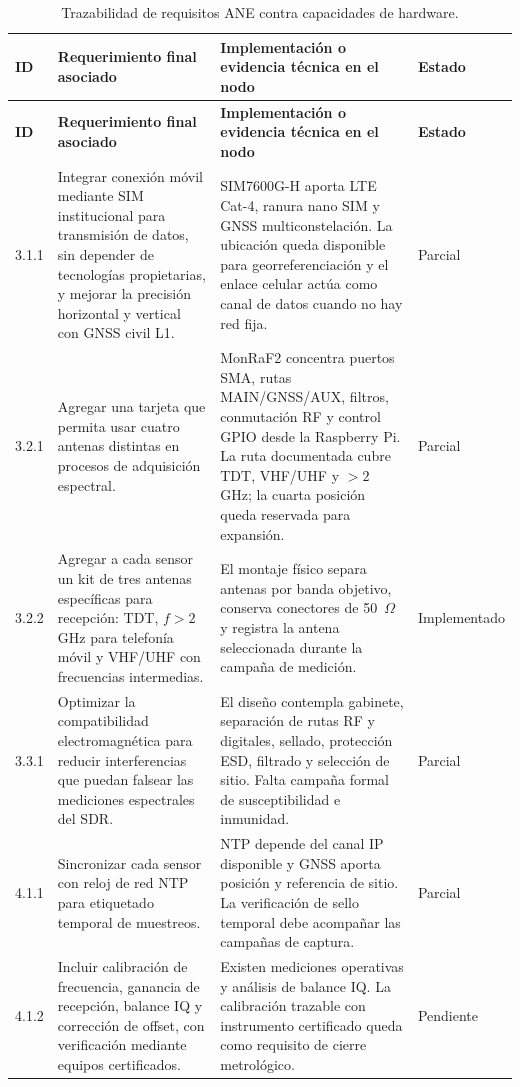 \scriptsize
\setlength{\tabcolsep}{3pt}
\begin{longtable}{@{}p{1.2cm} p{4.3cm} p{4.8cm} p{1.9cm}@{}}
\caption{Trazabilidad de requisitos ANE contra capacidades de hardware.}
\label{tab:hw_trazabilidad_requisitos}\\
\toprule
\textbf{ID} & \textbf{Requerimiento final asociado} & \textbf{Implementación o evidencia técnica en el nodo} & \textbf{Estado} \\
\midrule
\endfirsthead
\toprule
\textbf{ID} & \textbf{Requerimiento final asociado} & \textbf{Implementación o evidencia técnica en el nodo} & \textbf{Estado} \\
\midrule
\endhead
3.1.1 & Integrar conexión móvil mediante SIM institucional para transmisión de datos, sin depender de tecnologías propietarias, y mejorar la precisión horizontal y vertical con GNSS civil L1. & SIM7600G-H aporta LTE Cat-4, ranura nano SIM y GNSS multiconstelación. La ubicación queda disponible para georreferenciación y el enlace celular actúa como canal de datos cuando no hay red fija. & Parcial \\
3.2.1 & Agregar una tarjeta que permita usar cuatro antenas distintas en procesos de adquisición espectral. & MonRaF2 concentra puertos SMA, rutas MAIN/GNSS/AUX, filtros, conmutación RF y control GPIO desde la Raspberry Pi. La ruta documentada cubre TDT, VHF/UHF y $>2$ GHz; la cuarta posición queda reservada para expansión. & Parcial \\
3.2.2 & Agregar a cada sensor un kit de tres antenas específicas para recepción: TDT, $f>2$ GHz para telefonía móvil y VHF/UHF con frecuencias intermedias. & El montaje físico separa antenas por banda objetivo, conserva conectores de 50~$\Omega$ y registra la antena seleccionada durante la campaña de medición. & Implementado \\
3.3.1 & Optimizar la compatibilidad electromagnética para reducir interferencias que puedan falsear las mediciones espectrales del SDR. & El diseño contempla gabinete, separación de rutas RF y digitales, sellado, protección ESD, filtrado y selección de sitio. Falta campaña formal de susceptibilidad e inmunidad. & Parcial \\
4.1.1 & Sincronizar cada sensor con reloj de red NTP para etiquetado temporal de muestreos. & NTP depende del canal IP disponible y GNSS aporta posición y referencia de sitio. La verificación de sello temporal debe acompañar las campañas de captura. & Parcial \\
4.1.2 & Incluir calibración de frecuencia, ganancia de recepción, balance IQ y corrección de offset, con verificación mediante equipos certificados. & Existen mediciones operativas y análisis de balance IQ. La calibración trazable con instrumento certificado queda como requisito de cierre metrológico. & Pendiente \\

\end{longtable}
